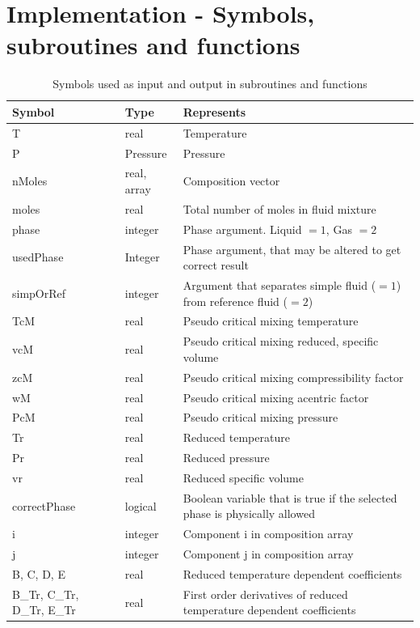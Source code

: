 \documentclass[english]{../thermomemo/thermomemo}
\numberwithin{equation}{section}
\begin{document}
\section{Implementation - Symbols, subroutines and functions}
\label{app:subFunc}
\renewcommand{\arraystretch}{1.2}
\begin{table}[h!]
\begin{center}
\caption{Symbols used as input and output in subroutines and functions}
\label{tab:symbols}
\begin{tabular}{p{2.8cm} l p{8cm}}
\hline
Symbol	& Type		& Represents 			\\
\hline
T		& real		& Temperature 			\\
P		& Pressure 	& Pressure 				\\
nMoles 	& real, array & Composition vector 	\\
moles	& real		& Total number of moles in fluid mixture \\
phase	& integer	& Phase argument. Liquid $= 1$, Gas $= 2$ \\
usedPhase & Integer	& Phase argument, that may be altered to get correct result \\
simpOrRef & integer	& Argument that separates simple fluid ($= 1$) from reference fluid ($= 2$) \\
TcM		& real		& Pseudo critical mixing temperature \\
vcM		& real		& Pseudo critical mixing reduced, specific volume \\
zcM		& real		& Pseudo critical mixing compressibility factor \\
wM		& real		& Pseudo critical mixing acentric factor \\
PcM		& real		& Pseudo critical mixing pressure \\
Tr		& real		& Reduced temperature 	\\ 
Pr		& real		& Reduced pressure		\\
vr		& real		& Reduced specific volume \\
correctPhase	& logical	& Boolean variable that is true if the selected phase is physically allowed \\
i		& integer	& Component i in composition array \\
j		& integer	& Component j in composition array \\
B, C, D, E & real	& Reduced temperature dependent coefficients \\
B\_Tr, C\_Tr, D\_Tr, E\_Tr & real	& First order derivatives of reduced temperature dependent coefficients \\

\end{tabular}
\end{center}
\end{table}
\end{document}

